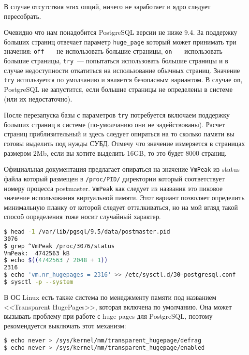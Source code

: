 В случае отсутствия этих опций, ничего не заработает и ядро следует пересобрать.

Очевидно что нам понадобится PostgreSQL версии не ниже 9.4. За поддержку больших страниц отвечает параметр \lstinline!huge_page! который может принимать три значения: \lstinline!off!~--- не использовать большие страницы, \lstinline!on!~--- использовать большие страницы, \lstinline!try!~--- попытаться использовать большие страницы и в случае недоступности откатиться на использование обычных страниц. Значение \lstinline!try! используется по умолчанию и является безопасным вариантом. В случае \lstinline!on!, PostgreSQL не запустится, если большие страницы не определены в системе (или их недостаточно).

После перезапуска базы с параметров \lstinline!try! потребуется включаем поддержку больших страниц в системе (по-умолчанию они не задействованы). Расчет страниц приблизительный и здесь следует опираться на то сколько памяти вы готовы выделить под нужды СУБД. Отмечу что значение измеряется в страницах размером 2Mb, если вы хотите выделить 16GB, то это будет 8000 страниц.

Официальная документация предлагает опираться на значение \lstinline!VmPeak! из status файла который размещен в \lstinline!/proc/PID/! директории который соответствует номеру процесса postmaster. \lstinline!VmPeak! как следует из названия это пиковое значение использования виртуальной памяти. Этот вариант позволяет определить минимальную планку от которой следует отталкиваться, но на мой вгляд такой способ определения тоже носит случайный характер.

\begin{lstlisting}[language=Bash,label=lst:settings_hugepages2,caption=Включаем поддержку huge pages в системе]
$ head -1 /var/lib/pgsql/9.5/data/postmaster.pid
3076
$ grep ^VmPeak /proc/3076/status
VmPeak:  4742563 kB
$ echo $((4742563 / 2048 + 1))
2316
$ echo 'vm.nr_hugepages = 2316' >> /etc/sysctl.d/30-postgresql.conf
$ sysctl -p --system
\end{lstlisting}

В ОС Linux есть также система по менеджменту памяти под названием <<Transparent HugePages>>, которая включена по умолчанию. Она может вызывать проблему при работе с huge pages для PostgreSQL, поэтому рекомендуется выключать этот механизм:

\begin{lstlisting}[language=Bash,label=lst:settings_hugepages3,caption=Отключаем Transparent HugePages]
$ echo never > /sys/kernel/mm/transparent_hugepage/defrag
$ echo never > /sys/kernel/mm/transparent_hugepage/enabled
\end{lstlisting}

